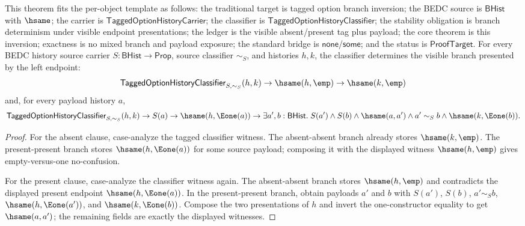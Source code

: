 \begin{theorem}
\label{thm:tagged-option-history-classifier-visible-branch-inversion}
This theorem fits the per-object template as follows: the traditional target is
tagged option branch inversion; the BEDC source is $\mathsf{BHist}$ with
$\hsame$; the carrier is $\mathsf{TaggedOptionHistoryCarrier}$; the classifier is
$\mathsf{TaggedOptionHistoryClassifier}$; the stability obligation is branch
determinism under visible endpoint presentations; the ledger is the visible
absent/present tag plus payload; the core theorem is this inversion; exactness
is no mixed branch and payload exposure; the standard bridge is
$\mathsf{none}$/$\mathsf{some}$; and the status is $\mathsf{ProofTarget}$.
For every BEDC history source carrier $S:\mathsf{BHist}\to\mathsf{Prop}$,
source classifier $\sim_S$, and histories $h,k$, the classifier determines the
visible branch presented by the left endpoint:
$$
\mathsf{TaggedOptionHistoryClassifier}_{S,\sim_S}(h,k)\to
\hsame(h,\emp)\to
\hsame(k,\emp)
$$
and, for every payload history $a$,
$$
\mathsf{TaggedOptionHistoryClassifier}_{S,\sim_S}(h,k)\to
S(a)\to
\hsame(h,\Eone(a))\to
\exists a',b:\mathsf{BHist}.\;
S(a')\land S(b)\land \hsame(a,a')\land a'\sim_S b\land
\hsame(k,\Eone(b)).
$$
\end{theorem}
\begin{proof}
For the absent clause, case-analyze the tagged classifier witness. The
absent-absent branch already stores $\hsame(k,\emp)$. The present-present branch
stores $\hsame(h,\Eone(a))$ for some source payload; composing it with the
displayed witness $\hsame(h,\emp)$ gives empty-versus-one no-confusion.

For the present clause, case-analyze the classifier witness again. The
absent-absent branch stores $\hsame(h,\emp)$ and contradicts the displayed
present endpoint $\hsame(h,\Eone(a))$. In the present-present branch, obtain
payloads $a'$ and $b$ with $S(a')$, $S(b)$, $a'\sim_S b$,
$\hsame(h,\Eone(a'))$, and $\hsame(k,\Eone(b))$. Compose the two presentations
of $h$ and invert the one-constructor equality to get $\hsame(a,a')$; the
remaining fields are exactly the displayed witnesses.
\end{proof}

